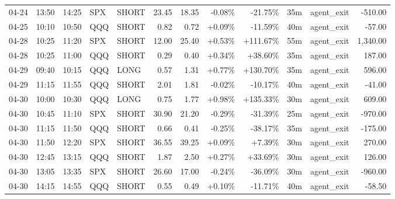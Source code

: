 \documentclass[11pt,a4paper,twoside]{article}
\begin{document}
\begin{center}
\begin{longtable}{>{\color{txtmain}}l l l l l r r r r r >{\color{txtmain}}l r}
04-24 & 13:50 & 14:25 & SPX & SHORT & 23.45 & 18.35 & \textcolor{lossred}{-0.08\%} & \textcolor{lossred}{-21.75\%} & 35m & agent\_exit & \textcolor{lossred}{-510.00} \\
04-25 & 10:10 & 10:50 & QQQ & SHORT & 0.82 & 0.72 & \textcolor{wingreen}{+0.09\%} & \textcolor{lossred}{-11.59\%} & 40m & agent\_exit & \textcolor{lossred}{-57.00} \\
04-28 & 10:25 & 11:20 & SPX & SHORT & 12.00 & 25.40 & \textcolor{wingreen}{+0.53\%} & \textcolor{wingreen}{+111.67\%} & 55m & agent\_exit & \textcolor{wingreen}{1,340.00} \\
04-28 & 10:25 & 11:00 & QQQ & SHORT & 0.29 & 0.40 & \textcolor{wingreen}{+0.34\%} & \textcolor{wingreen}{+38.60\%} & 35m & agent\_exit & \textcolor{wingreen}{187.00} \\
04-29 & 09:40 & 10:15 & QQQ & LONG & 0.57 & 1.31 & \textcolor{wingreen}{+0.77\%} & \textcolor{wingreen}{+130.70\%} & 35m & agent\_exit & \textcolor{wingreen}{596.00} \\
04-29 & 11:15 & 11:55 & QQQ & SHORT & 2.01 & 1.81 & \textcolor{lossred}{-0.02\%} & \textcolor{lossred}{-10.17\%} & 40m & agent\_exit & \textcolor{lossred}{-41.00} \\
04-30 & 10:00 & 10:30 & QQQ & LONG & 0.75 & 1.77 & \textcolor{wingreen}{+0.98\%} & \textcolor{wingreen}{+135.33\%} & 30m & agent\_exit & \textcolor{wingreen}{609.00} \\
04-30 & 10:45 & 11:10 & SPX & SHORT & 30.90 & 21.20 & \textcolor{lossred}{-0.29\%} & \textcolor{lossred}{-31.39\%} & 25m & agent\_exit & \textcolor{lossred}{-970.00} \\
04-30 & 11:15 & 11:50 & QQQ & SHORT & 0.66 & 0.41 & \textcolor{lossred}{-0.25\%} & \textcolor{lossred}{-38.17\%} & 35m & agent\_exit & \textcolor{lossred}{-175.00} \\
04-30 & 11:50 & 12:20 & SPX & SHORT & 36.55 & 39.25 & \textcolor{wingreen}{+0.09\%} & \textcolor{wingreen}{+7.39\%} & 30m & agent\_exit & \textcolor{wingreen}{270.00} \\
04-30 & 12:45 & 13:15 & QQQ & SHORT & 1.87 & 2.50 & \textcolor{wingreen}{+0.27\%} & \textcolor{wingreen}{+33.69\%} & 30m & agent\_exit & \textcolor{wingreen}{126.00} \\
04-30 & 13:05 & 13:35 & SPX & SHORT & 26.60 & 17.00 & \textcolor{lossred}{-0.24\%} & \textcolor{lossred}{-36.09\%} & 30m & agent\_exit & \textcolor{lossred}{-960.00} \\
04-30 & 14:15 & 14:55 & QQQ & SHORT & 0.55 & 0.49 & \textcolor{wingreen}{+0.10\%} & \textcolor{lossred}{-11.71\%} & 40m & agent\_exit & \textcolor{lossred}{-58.50} \\

\end{longtable}
\end{center}
\end{document}
